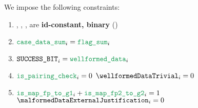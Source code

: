 We impose the following constraints:
\begin{enumerate}
    \item \malformedDataInternalJustification{}, \malformedDataExternalJustification{}, \wellformedDataTrivial{}, \wellformedDataNontrivial{}  are \textbf{id-constant, binary} \quad (\trash)
    \item $\locCaseDataSum _{i} = \locFlagSum        _{i}$
    \item $\blsSuccessBit  _{i} = \locWellformedData _{i}$
    \item \If $\locIsBlsPairingCheck _{i} = 0$ \Then $\wellformedDataTrivial _{i} = 0$
    \item \If $\locIsBlsMapFpToGOne _{i} + \locIsBlsMapFpTwoToGTwo _{i} = 1$ \Then $\malformedDataExternalJustification _{i} = 0$
\end{enumerate}
